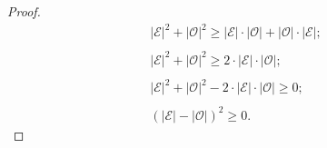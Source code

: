 \begin{lemma}
\begin{proof}
\begin{equation}
            \begin{array}{l}
                |\mathcal{E}|^2+|\mathcal{O}|^2\geq |\mathcal{E}|\cdot|\mathcal{O}| + |\mathcal{O}|\cdot|\mathcal{E}|;\\\\
                |\mathcal{E}|^2+|\mathcal{O}|^2\geq 2\cdot|\mathcal{E}|\cdot|\mathcal{O}|;\\\\
                |\mathcal{E}|^2+|\mathcal{O}|^2 - 2\cdot|\mathcal{E}|\cdot|\mathcal{O}|\geq 0; \\\\
                (|\mathcal{E}| - |\mathcal{O}|)^2 \geq 0.
            \end{array}
        \end{equation}
    \end{proof}
\end{lemma}
